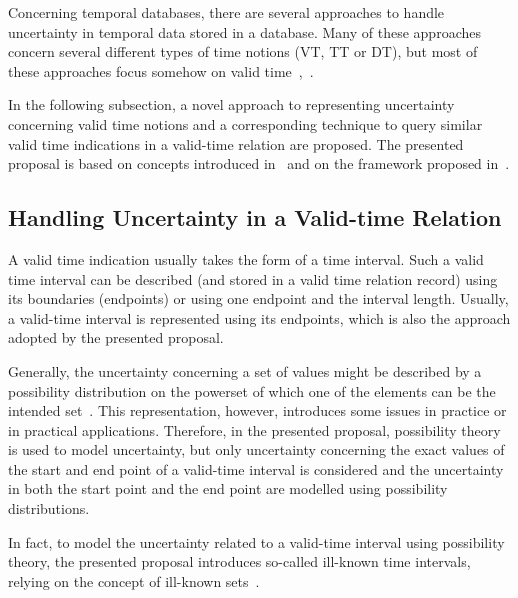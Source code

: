 Concerning temporal databases, there are several approaches to handle uncertainty in temporal data stored in a database. Many of these approaches concern several different types of time notions (VT, TT or DT), but most of these approaches focus somehow on valid time~\cite{garrido2009},~\cite{gal01}.

In the following subsection, a novel approach to representing uncertainty concerning valid time notions and a corresponding technique to query similar valid time indications in a valid-time relation are proposed. The presented proposal is based on concepts introduced in~\cite{Dubois88b} and on the framework proposed in~\cite{Pon11}.

\subsection{Handling Uncertainty in a Valid-time Relation}
A valid time indication usually takes the form of a time interval. Such a valid time interval can be described (and stored in a valid time relation record) using its boundaries (endpoints) or using one endpoint and the interval length. Usually, a valid-time interval is represented using its endpoints, which is also the approach adopted by the presented proposal. 

Generally, the uncertainty concerning a set of values might be described by a possibility distribution on the powerset of which one of the elements can be the intended set~\cite{Dubois88b}. This representation, however, introduces some issues in practice or in practical applications. Therefore, in the presented proposal, possibility theory is used to model uncertainty, but only uncertainty concerning the exact values of the start and end point of a valid-time interval is considered and the uncertainty in both the start point and the end point are modelled using possibility distributions.

In fact, to model the uncertainty related to a valid-time interval using possibility theory, the presented proposal introduces so-called ill-known time intervals, relying on the concept of ill-known sets~\cite{Dubois88b}.



